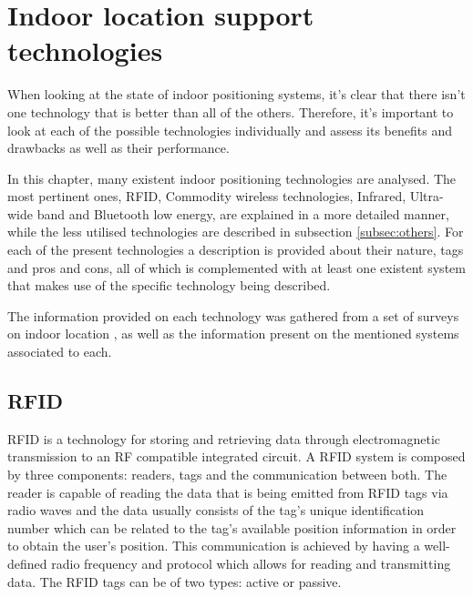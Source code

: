 \section{Indoor location support technologies}  
\label{sec:indoortech}  
  
  
When looking at the state of indoor positioning systems, it's clear that there isn't one technology that is better than all of the others. Therefore, it's important to look at each of the possible technologies individually and assess its benefits and drawbacks as well as their performance\cite{survey1}.  
  
  
In this chapter, many existent indoor positioning technologies are analysed. The most pertinent ones, \acf{RFID}, Commodity wireless technologies, Infrared, Ultra-wide band and Bluetooth low energy, are explained in a more detailed manner, while the less utilised technologies are described in subsection \ref{subsec:others}. For each of the present technologies a description is provided about their nature, tags and pros and cons, all of which is complemented with at least one existent system that makes use of the specific technology being described.   
  
  
The information provided on each technology was gathered from a set of surveys on indoor location \cite{surveythesis,survey2,survey1}, as well as the information present on the mentioned systems associated to each.  
  
  
\subsection{RFID}  
\label{subsec:rfid}  
  
  
\ac{RFID} is a technology for storing and retrieving data through electromagnetic transmission to an RF compatible integrated circuit. A \ac{RFID} system is composed by three components: readers, tags and the communication between both. The reader is capable of reading the data that is being emitted from \ac{RFID} tags via radio waves and the data usually consists of the tag's unique identification number which can be related to the tag's available position information in order to obtain the user's position. This communication is achieved by having a well-defined radio frequency and protocol which allows for reading and transmitting data. The \ac{RFID} tags can be of two types: active or passive.  
  
